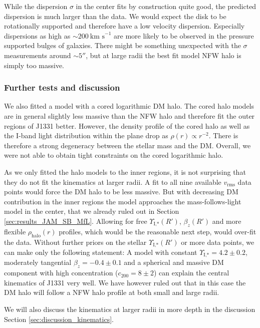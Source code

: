 \documentclass[useAMS,usenatbib]{mnras}
\begin{document}
While the dispersion $\sigma$ in the center fits by construction quite good, the predicted dispersion is much larger than the data. We would expect the disk to be rotationally supported and therefore have a low velocity dispersion. Especially dispersions as high as $\sim 200~\text{km s}^{-1}$ are more likely to be observed in the pressure supported bulges of galaxies. There might be something unexpected with the $\sigma$ measurements around $\sim 5''$, but at large radii the best fit model NFW halo is simply too massive.


\subsubsection{Further tests and discussion}

We also fitted a model with a cored logarithmic DM halo. The cored halo models are in general slightly less massive than the NFW halo and therefore fit the outer regions of J1331 better. However, the density profile of the cored halo as well as the I-band light distribution within the plane drop as $\rho(r) \propto r^{-2}$. There is therefore a strong degeneracy between the stellar mass and the DM. Overall, we were not able to obtain tight constraints on the cored logarithmic halo.

As we only fitted the halo models to the inner regions, it is not surprising that they do not fit the kinematics at larger radii. A fit to all nine available $v_\text{rms}$ data points would force the DM halo to be less massive. But with decreasing DM contribution in the inner regions the model approaches the mass-follows-light model in the center, that we already ruled out in Section \ref{sec:results_JAM_SB_MfL}. Allowing for free $\Upsilon_\text{I,*}(R')$, $\beta_z(R')$ and more flexible $\rho_\text{halo}(r)$ profiles, which would be the reasonable next step, would over-fit the data. Without further priors on the stellar $\Upsilon_\text{I,*}(R')$ or more data points, we can make only the following statement: A model with constant $\Upsilon_\text{I,*} = 4.2\pm 0.2$, moderately tangential $\beta_z = -0.4\pm 0.1$ and a spherical and massive DM component with high concentration ($c_\text{200}=8\pm 2$) can explain the central kinematics of J1331 very well. We have however ruled out that in this case the DM halo will follow a NFW halo profile at both small and large radii.

We will also discuss the kinematics at larger radii in more depth in the discussion Section \ref{sec:discussion_kinematics}.
\end{document}
